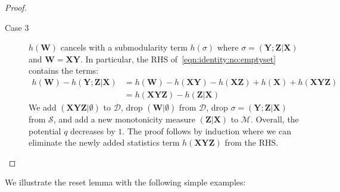 \documentclass[10pt,a4paper]{article}
\newcommand{\calM}{\mathcal M}
\newcommand{\calS}{\mathcal S}
\newcommand{\calD}{\mathcal D}
\begin{document}
\begin{proof}
\begin{description}
    \item[Case 3] $h(\bm W)$ cancels with a submodularity term $h(\sigma)$ where
    $\sigma = (\bm Y;\bm Z|\bm X)$ and $\bm W = \bm X \bm Y$.
    In particular, the RHS of~\eqref{eqn:identity:no:emptyset} contains the terms:
    \begin{align}
      h(\bm W) -h(\bm Y;\bm Z|\bm X)&=
      h(\bm W) -h(\bm X\bm Y) - h(\bm X\bm Z) + h(\bm X) + h(\bm X \bm Y \bm Z) \nonumber \\
      &= h(\bm X \bm Y \bm Z)  - h(\bm Z|\bm X)
      \label{eqn:S:step}
    \end{align}
    We add $(\bm X\bm Y\bm Z|\emptyset)$ to $\calD$, drop $(\bm W|\emptyset)$ from $\calD$,
    drop $\sigma = (\bm Y;\bm Z|\bm X)$ from $\calS$, and add a new monotonicity measure
    $(\bm Z|\bm X)$ to $\calM$. Overall, the potential $q$ decreases by $1$.
    The proof follows by induction where we can eliminate the newly added statistics term $h(\bm X\bm Y\bm Z)$ from the RHS.
  \end{description}
\end{proof}

We illustrate the reset lemma with the following simple examples:
\end{document}
